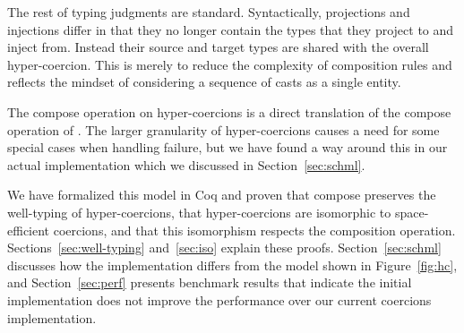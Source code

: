 \documentclass[acmtog, authorversion, acmlarge]{acmart}
\begin{document}
The rest of typing judgments are standard. Syntactically, projections
and injections differ in that they no longer contain the types that they
project to and inject from. Instead their source and target types
are shared with the overall hyper-coercion. This is merely to reduce
the complexity of composition rules and reflects the mindset of
considering a sequence of casts as a single entity.

The compose operation on hyper-coercions is a direct translation
of the compose operation of \citet{Siek:2015ab}. The larger granularity
of hyper-coercions causes a need for some special cases when
handling failure, but we have found a way around this in our
actual implementation which we discussed in Section~\ref{sec:schml}.

We have formalized this model in Coq and proven that compose preserves
the well-typing of hyper-coercions, that hyper-coercions are
isomorphic to space-efficient coercions, and that this isomorphism
respects the composition operation. Sections~\ref{sec:well-typing}
and~\ref{sec:iso} explain these proofs. Section~\ref{sec:schml}
discusses how the implementation differs from the model shown in
Figure~\ref{fig:hc}, and Section~\ref{sec:perf} presents benchmark
results that indicate the initial implementation does not improve the
performance over our current coercions implementation.
\end{document}
